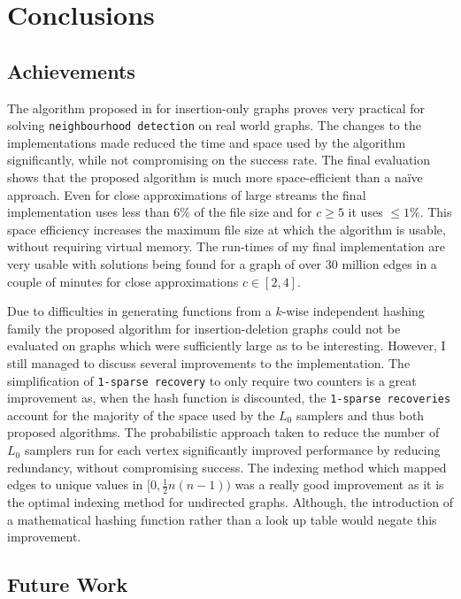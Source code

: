 \documentclass[11pt,twoside,a4paper]{report}
\begin{document}
\chapter{Conclusions}

\section{Achievements}

The algorithm proposed in \cite{orig} for insertion-only graphs proves very practical for solving \texttt{neighbourhood detection} on real world graphs. The changes to the implementations made reduced the time and space used by the algorithm significantly, while not compromising on the success rate. The final evaluation shows that the proposed algorithm is much more space-efficient than a naïve approach. Even for close approximations of large streams the final implementation uses less than $6\%$ of the file size and for $c\geq5$ it uses $\leq1\%$. This space efficiency increases the maximum file size at which the algorithm is usable, without requiring virtual memory. The run-times of my final implementation are very usable with solutions being found for a graph of over 30 million edges in a couple of minutes for close approximations $c\in[2,4]$.
\par Due to difficulties in generating functions from a $k$-wise independent hashing family the proposed algorithm for insertion-deletion graphs could not be evaluated on graphs which were sufficiently large as to be interesting. However, I still managed to discuss several improvements to the implementation. The simplification of \texttt{1-sparse recovery} to only require two counters is a great improvement as, when the hash function is discounted, the \texttt{1-sparse recoveries} account for the majority of the space used by the $L_0$ samplers and thus both proposed algorithms. The probabilistic approach taken to reduce the number of $L_0$ samplers run for each vertex significantly improved performance by reducing redundancy, without compromising success. The indexing method which mapped edges to unique values in $[0,\frac12n(n-1))$ was a really good improvement as it is the optimal indexing method for undirected graphs. Although, the introduction of a mathematical hashing function rather than a look up table would negate this improvement.

\section{Future Work}
\end{document}
